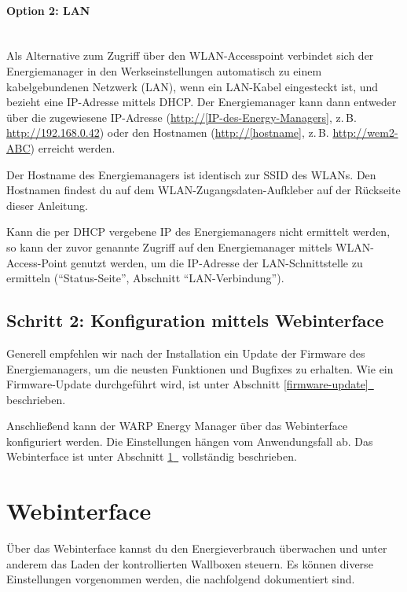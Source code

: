 \documentclass[a4paper,10pt]{article}
\newcommand*{\fullref}[1]{Abschnitt \hyperref[{#1}]{\ref*{#1}~\nameref*{#1}}}
\begin{document}
\begin{multicols*}{2}
	\paragraph{Option 2: LAN}\ \\
	Als Alternative zum Zugriff über den WLAN-Accesspoint verbindet sich der
	Energiemanager in den Werkseinstellungen automatisch zu einem
	kabelgebundenen Netzwerk (LAN), wenn ein LAN-Kabel eingesteckt ist, und bezieht eine IP-Adresse
	mittels DHCP. Der Energiemanager kann dann entweder über die zugewiesene IP-Adresse
	(\url{http://[IP-des-Energy-Managers]}, z.\,B. \url{http://192.168.0.42})
	oder den Hostnamen (\url{http://[hostname]}, z.\,B. \url{http://wem2-ABC}) erreicht werden.

	Der Hostname des Energiemanagers ist identisch zur SSID des WLANs. Den Hostnamen findest du
	auf dem WLAN-Zugangsdaten-Aufkleber auf der Rückseite dieser Anleitung.

	Kann die per DHCP vergebene IP des Energiemanagers nicht ermittelt werden, so kann der
	zuvor genannte Zugriff auf den Energiemanager mittels WLAN-Access-Point genutzt
	werden, um die IP-Adresse der LAN-Schnittstelle zu ermitteln
	(\enquote{Status-Seite}, Abschnitt \enquote{LAN-Verbindung}).


	\subsection{Schritt 2: Konfiguration mittels Webinterface}
	Generell empfehlen wir nach der Installation ein Update der Firmware des
	Energiemanagers, um die neusten Funktionen und Bugfixes zu erhalten. Wie ein
	Firmware-Update durchgeführt wird, ist unter \fullref{firmware-update}
	beschrieben.

	Anschließend kann der WARP Energy Manager über das Webinterface konfiguriert
	werden. Die Einstellungen hängen vom Anwendungsfall ab.
	Das Webinterface ist unter \fullref{webinterface} vollständig beschrieben.

	\newpage
	\section{Webinterface}
	\label{webinterface}
	\vspace{-0.2cm}

	Über das Webinterface kannst du den Energieverbrauch überwachen und
	unter anderem das Laden der kontrollierten Wallboxen steuern.
	Es können diverse Einstellungen vorgenommen werden, die nachfolgend
	dokumentiert sind.


\end{multicols*}
\end{document}
